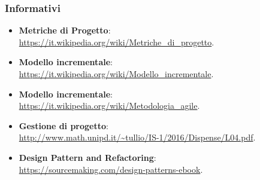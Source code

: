 {		\subsubsection{Informativi}
			\begin{itemize}
				\item \textbf{Metriche di Progetto}: \\
				\textcolor{blue}{\url{https://it.wikipedia.org/wiki/Metriche_di_progetto}}.
				\item \textbf{Modello incrementale}: \\
				\textcolor{blue}{\url{https://it.wikipedia.org/wiki/Modello_incrementale}}.
				\item \textbf{Modello incrementale}: \\
				\textcolor{blue}{\url{https://it.wikipedia.org/wiki/Metodologia_agile}}.
				\item \textbf{Gestione di progetto}: \\
				\textcolor{blue}{\url{http://www.math.unipd.it/~tullio/IS-1/2016/Dispense/L04.pdf}}.
				\item \textbf{Design Pattern and Refactoring}: \\
				\textcolor{blue}{\url{https://sourcemaking.com/design-patterns-ebook}}.
			\end{itemize}
}
